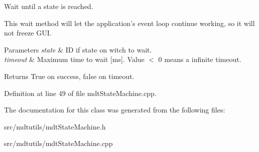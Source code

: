 Wait until a state is reached. 

This wait method will let the application's event loop continue working, so it will not freeze GUI.


\begin{DoxyParams}{Parameters}
{\em state} & ID if state on witch to wait. \\
\hline
{\em timeout} & Maximum time to wait \mbox{[}ms\mbox{]}. Value $<$ 0 means a infinite timeout. \\
\hline
\end{DoxyParams}
\begin{DoxyReturn}{Returns}
True on success, false on timeout. 
\end{DoxyReturn}


Definition at line 49 of file mdtStateMachine.cpp.



The documentation for this class was generated from the following files:\begin{DoxyCompactItemize}
\item 
src/mdtutils/mdtStateMachine.h\item 
src/mdtutils/mdtStateMachine.cpp\end{DoxyCompactItemize}
